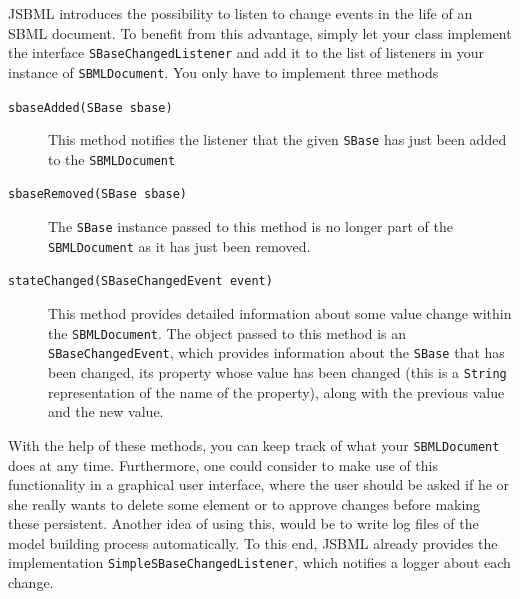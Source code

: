 JSBML introduces the possibility to listen to change events in the life of an
SBML document. To benefit from this advantage, simply let your class implement
the interface \texttt{SBaseChangedListener} and add it to the list of listeners in
your instance of \texttt{SBMLDocument}. You only have to implement three methods
\begin{description}
 \item[\texttt{sbaseAdded(SBase sbase)}] This method notifies the listener that the given \texttt{SBase}
   has just been added to the \texttt{SBMLDocument}
 \item[\texttt{sbaseRemoved(SBase sbase)}] The \texttt{SBase} instance passed to this method is no
   longer part of the \texttt{SBMLDocument} as it has just been removed.
 \item[\texttt{stateChanged(SBaseChangedEvent event)}] This method provides detailed information about some value
   change within the \texttt{SBMLDocument}. The object passed to this method is
   an \texttt{SBaseChangedEvent}, which provides information about the \texttt{SBase}
   that has been changed, its property whose value has been changed (this is a
   \texttt{String} representation of the name of the property), along with the
   previous value and the new value.
\end{description}
With the help of these methods, you can keep track of what your
\texttt{SBMLDocument} does at any time.
Furthermore, one could consider to make use of this functionality in a graphical
user interface, where the user should be asked
if he or she really wants to delete some element or to approve changes before
making these persistent. Another idea of using this, would be to write log
files of the model building process
automatically. To this end, JSBML already provides the implementation
\texttt{SimpleSBaseChangedListener},
%
which notifies a logger about each change.

